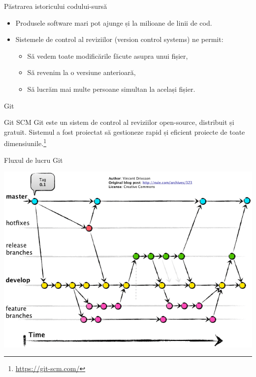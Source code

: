 \documentclass[presentation]{beamer}
\begin{document}
\begin{frame}[label={sec:orgaa13183}]{Păstrarea istoricului codului-sursă}
\begin{itemize}
\item Produsele software mari pot ajunge și la milioane de linii de cod.
\item Sistemele de control al reviziilor (version control systems) ne permit:
\begin{itemize}
\item Să vedem toate modificările făcute asupra unui fișier,
\item Să revenim la o versiune anterioară,
\item Să lucrăm mai multe persoane simultan la același fișier.
\end{itemize}
\end{itemize}
\end{frame}
\begin{frame}[label={sec:org96c91e6}]{Git}
\begin{block}{Git SCM}
Git este un sistem de control al reviziilor open-source, distribuit și gratuit. Sistemul a fost proiectat să gestioneze rapid și eficient proiecte de toate dimensiunile.\footnote{\url{https://git-scm.com/}}
\end{block}
\end{frame}
\begin{frame}[label={sec:orgb71c59d}]{Fluxul de lucru Git}
\begin{center}
\includegraphics[width=\textwidth]{img/gitflow.png}
\end{center}
\end{frame}
\end{document}
